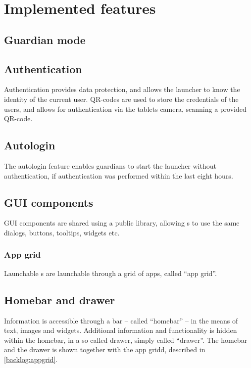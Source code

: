 \section{Implemented features}
\label{backlog_implemented}

\subsection{Guardian mode}
\label{backlog:guardian_mode}
%
\subsection{Authentication}
\label{backlog:authentication}
Authentication provides data protection, and allows the launcher to know the identity of the current user.
QR-codes are used to store the credentials of the users, and allows for authentication via the tablets camera, scanning a provided QR-code.

\subsection{Autologin}
\label{backlog:autologin}
The autologin feature enables guardians to start the launcher without authentication, if authentication was performed within the last eight hours.

%
\subsection{GUI components}
\label{backlog:GUI_components}
GUI components are shared using a public library, allowing \girafapp[]s to use the same dialogs, buttons, tooltips, widgets etc.

\subsubsection{App grid}
\label{backlog:appgrid}
Launchable \girafapp[]s are launchable through a grid of apps, called ``app grid''.

%
\subsection{Homebar and drawer}
\label{backlog:homebar_drawer}
Information is accessible through a bar -- called ``homebar'' -- in the means of text, images and widgets.
Additional information and functionality is hidden within the homebar, in a so called drawer, simply called ``drawer''. The homebar and the drawer is shown together with the app gridd, described in \autoref{backlog:appgrid}.

